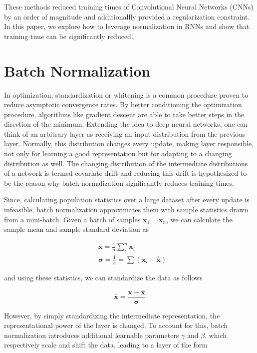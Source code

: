\documentclass{article}
\def\x{{\mathbf x}}
\begin{document}
These methods reduced training times of Convolutional Neural Networks (CNNs) by an order of magnitude and additionallly provided a regularization constraint. In this paper, we explore how to leverage normalization in RNNs and show that training time can be significantly reduced.

\section{Batch Normalization}

In optimization, standardization or whitening is a common procedure proven to reduce asymptotic convergence rates. By better conditioning the optimization procedure, algorithms like gradient descent are able to take better steps in the direction of the minimum. Extending the idea to deep neural networks, one can think of an arbitrary layer as receiving an input distribution from the previous layer. Normally, this distribution changes every update, making layer responsible, not only for learning a good representation but for adapting to a changing distribution as well. The changing distribution of the intermediate distributions of a network is termed covariate drift and reducing this drift is hypothesized to be the reason why batch normalization significantly reduces training times.

Since, calculating population statistics over a large dataset after every update is infeasible, batch normalization approximates them with sample statistics drawn from a mini-batch. Given a batch of samples $\x_1, \dots \x_n$, we can calculate the sample mean and sample standard deviation as

\begin{equation}
	\begin{split}
		& \bar \x = \frac{1}{n} \sum_i^n \x_i \\
		& \boldsymbol{\sigma} = \frac{1}{n} = \sum (\x_i - \hat \x)
	\end{split}
\end{equation}

and using these statistics, we can standardize the data as follows

\begin{equation}
	\hat \x = \frac{\x - \bar \x}{\boldsymbol \sigma}
\end{equation}

However, by simply standardizing the intermediate representation, the representational power of the layer is changed. To account for this, batch normalization introduces additional learnable parameters $\gamma$ and $\beta$, which respectively scale and shift the data, leading to a layer of the form
\end{document}
